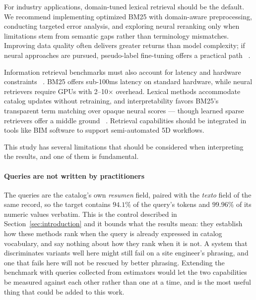 \documentclass[preprint,12pt]{elsarticle}
\begin{document}
For industry applications, domain-tuned lexical retrieval should be the default. We recommend implementing optimized BM25 with domain-aware preprocessing, conducting targeted error analysis, and exploring neural reranking only when limitations stem from semantic gaps rather than terminology mismatches. Improving data quality often delivers greater returns than model complexity; if neural approaches are pursued, pseudo-label fine-tuning offers a practical path ~\cite{li2022domain}.

Information retrieval benchmarks must also account for latency and hardware constraints ~\cite{santhanam-etal-2023-moving}. BM25 offers sub-100ms latency on standard hardware, while neural retrievers require GPUs with 2–10× overhead. Lexical methods accommodate catalog updates without retraining, and interpretability favors BM25's transparent term matching over opaque neural scores --- though learned sparse retrievers offer a middle ground ~\cite{bruch2023analysis}. Retrieval capabilities should  be integrated in tools like BIM software to support semi-automated 5D workflows.

This study has several limitations that should be considered when interpreting the results, and one of them is fundamental.

\paragraph{Queries are not written by practitioners} The queries are the catalog's own \textit{resumen} field, paired with the \textit{texto} field of the same record, so the target contains $94.1\%$ of the query's tokens and $99.96\%$ of its numeric values verbatim. This is the control described in Section~\ref{sec:introduction} and it bounds what the results mean: they establish how these methods rank when the query is already expressed in catalog vocabulary, and say nothing about how they rank when it is not. A system that discriminates variants well here might still fail on a site engineer's phrasing, and one that fails here will not be rescued by better phrasing. Extending the benchmark with queries collected from estimators would let the two capabilities be measured against each other rather than one at a time, and is the most useful thing that could be added to this work.
\end{document}
